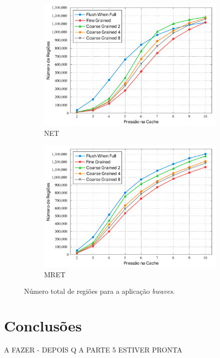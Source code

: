 \documentclass[12pt,twoside]{article}
\begin{document}
\begin{figure}[!ht]
        \centering
        \begin{subfigure}[b]{0.45\textwidth}
                \includegraphics[width=\textwidth]{./figs/net-bwaves-tot-regions}
                \caption{NET}
                \label{fig-net-bwaves-tot-regions}
        \end{subfigure}
        \quad %
                \begin{subfigure}[b]{0.45\textwidth}
                \includegraphics[width=\textwidth]{./figs/mret-bwaves-tot-regions}
                \caption{MRET}
                \label{fig-mret-bwaves-tot-regions}
        \end{subfigure}
\caption{Número total de regiões para a aplicação \emph{bwaves}.}
\end{figure}




\newpage

\section{Conclusões}
\begin{large}
A FAZER - DEPOIS Q A PARTE 5 ESTIVER PRONTA
\end{large}




\end{document}
